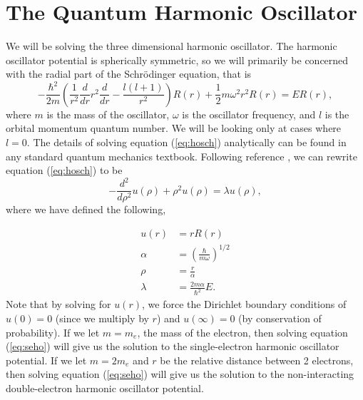 \documentclass[a4paper,12pt]{report}
\begin{document}
\section{The Quantum Harmonic Oscillator}\label{sec:ho}
We will be solving the three dimensional harmonic oscillator. The harmonic oscillator potential is spherically symmetric, so we will primarily be concerned with the radial part of the Schr\"odinger equation, that is
\begin{equation}\label{eq:hosch}
 -\frac{\hbar^2}{2m}\left(\frac{1}{r^2}\frac{d}{dr}r^2\frac{d}{dr} - \frac{l(l+1)}{r^2} \right)R(r)+\frac{1}{2}m\omega^2 r^2 R(r)= ER(r),
\end{equation}
where $m$ is the mass of the oscillator, $\omega$ is the oscillator frequency, and $l$ is the orbital momentum quantum number. We will be looking only at cases where $l = 0$. The details of solving equation (\ref{eq:hosch}) analytically can be found in any standard quantum mechanics textbook. Following reference \cite{dux:2016}, we can rewrite equation (\ref{eq:hosch}) to be
\begin{equation}\label{eq:seho}
 -\frac{d^2}{d\rho^2}u(\rho) + \rho^2 u(\rho) = \lambda u(\rho),
\end{equation}
where we have defined the following,

 \begin{align*}
  u(r) &= rR(r) \\
  \alpha &= \left(\frac{\hbar}{m\omega} \right)^{1/2} \\ 
  \rho &= \frac{r}{\alpha} \\
  \lambda &= \frac{2m\alpha}{\hbar^2}E.
 \end{align*}
Note that by solving for $u(r)$, we force the Dirichlet boundary conditions of $u(0) = 0$ (since we multiply by $r$) and $u(\infty) = 0$ (by conservation of probability). If we let $m = m_e$, the mass of the electron, then solving equation (\ref{eq:seho}) will give us the solution to the single-electron harmonic oscillator potential. If we let $m = 2m_e$ and $r$ be the relative distance between 2 electrons, then solving equation (\ref{eq:seho}) will give us the solution to the non-interacting double-electron harmonic oscillator potential. 
\end{document}
